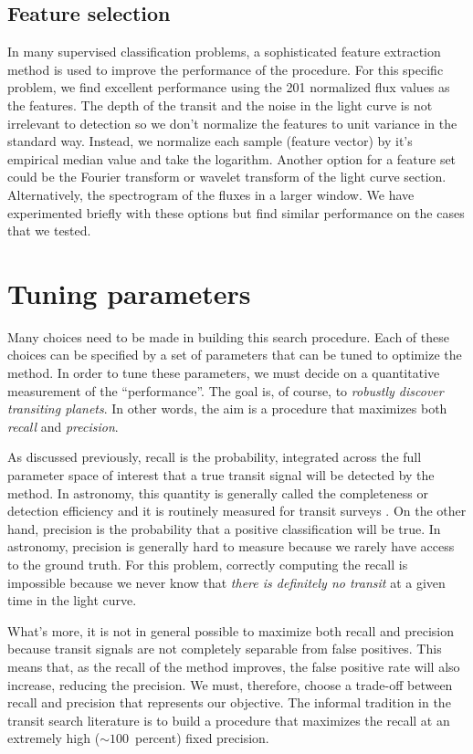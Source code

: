 \subsection{Feature selection}

In many supervised classification problems, a sophisticated feature
extraction method is used to improve the performance of the procedure.
For this specific problem, we find excellent performance using the 201
normalized flux values as the features.
The depth of the transit and the noise in the light curve is not irrelevant
to detection so we don't normalize the features to unit variance in the
standard way.
Instead, we normalize each sample (feature vector) by it's empirical median
value and take the logarithm.
Another option for a feature set could be the Fourier transform or wavelet
transform of the light curve section.
Alternatively, the spectrogram of the fluxes in a larger window.
We have experimented briefly with these options but find similar performance
on the cases that we tested.


\section{Tuning parameters}

Many choices need to be made in building this search procedure.
Each of these choices can be specified by a set of parameters that can be
tuned to optimize the method.
In order to tune these parameters, we must decide on a quantitative
measurement of the ``performance''.
The goal is, of course, to \emph{robustly discover transiting planets}.
In other words, the aim is a procedure that maximizes both \emph{recall} and
\emph{precision}.

As discussed previously, recall is the probability, integrated across the full
parameter space of interest that a true transit signal will be detected by the
method.
In astronomy, this quantity is generally called the completeness or detection
efficiency and it is routinely measured for transit surveys
\citep{Petigura:2013, Dressing:2015, Foreman-Mackey:2015}.
On the other hand, precision is the probability that a positive classification
will be true.
In astronomy, precision is generally hard to measure because we rarely have
access to the ground truth.
For this problem, correctly computing the recall is impossible because we
never know that \emph{there is definitely no transit} at a given time in the
light curve.

What's more, it is not in general possible to maximize both recall and
precision because transit signals are not completely separable from false
positives.
This means that, as the recall of the method improves, the false positive rate
will also increase, reducing the precision.
We must, therefore, choose a trade-off between recall and precision that
represents our objective.
The informal tradition in the transit search literature is to build a
procedure that maximizes the recall at an extremely high ($\sim 100$~percent)
fixed precision.

